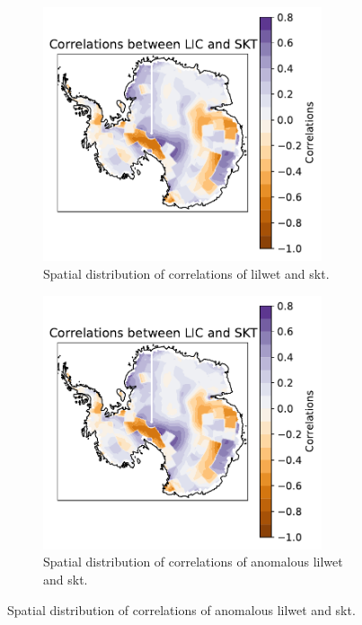 \documentclass[../main.tex]{subfiles}
\begin{document}
\begin{figure}[ht!]
\centering
\begin{subfigure}[ht!]{0.49\textwidth}
\centering
\includegraphics[width=0.9\textwidth]{images/week8/hres/corr_lic_skt_shortterm_spatial}
\caption{Spatial distribution of correlations of \gls{lilwet}  and \gls{skt}.}
\end{subfigure}
\begin{subfigure}[ht!]{0.49\textwidth}
\centering
\includegraphics[width=0.9\textwidth]{images/week8/hres/corr_lic_skt_shortterm_spatial_anmomalous}
\caption{Spatial distribution of correlations of anomalous \gls{lilwet}  and \gls{skt}.}

\end{subfigure}
\end{figure}
\end{document}
